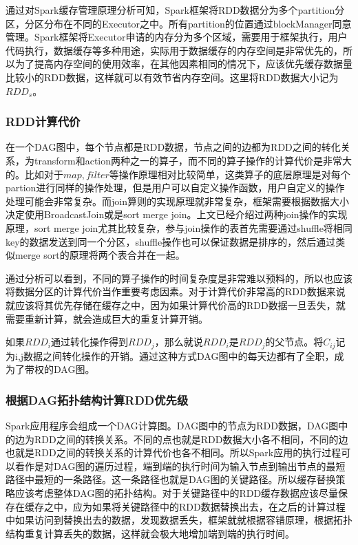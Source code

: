 通过对Spark缓存管理原理分析可知，Spark框架将RDD数据分为多个partition分区，分区分布在不同的Executor之中。所有partition的位置通过blockManager同意管理。Spark框架将Executor申请的内存分为多个区域，需要用于框架执行，用户代码执行，数据缓存等多种用途，实际用于数据缓存的内存空间是非常优先的，所以为了提高内存空间的使用效率，在其他因素相同的情况下，应该优先缓存数据量比较小的RDD数据，这样就可以有效节省内存空间。这里将RDD数据大小记为$RDD_s$。

\subsubsection{RDD计算代价}

在一个DAG图中，每个节点都是RDD数据，节点之间的边都为RDD之间的转化关系，为transform和action两种之一的算子，而不同的算子操作的计算代价是非常大的。比如对于$map,filter$等操作原理相对比较简单，这类算子的底层原理是对每个partion进行同样的操作处理，但是用户可以自定义操作函数，用户自定义的操作处理可能会非常复杂。而join算则的实现原理就非常复杂，框架需要根据数据大小决定使用BroadcastJoin或是sort merge join。上文已经介绍过两种join操作的实现原理，sort merge join尤其比较复杂，参与join操作的表首先需要通过shuffle将相同key的数据发送到同一个分区，shuffle操作也可以保证数据是排序的，然后通过类似merge sort的原理将两个表合并在一起。

通过分析可以看到，不同的算子操作的时间复杂度是非常难以预料的，所以也应该将数据分区的计算代价当作重要考虑因素。对于计算代价非常高的RDD数据来说就应该将其优先存储在缓存之中，因为如果计算代价高的RDD数据一旦丢失，就需要重新计算，就会造成巨大的重复计算开销。

如果$RDD_i$通过转化操作得到$RDD_j$，那么就说$RDD_i$是$RDD_j$的父节点。将$C_{ij}$记为i,j数据之间转化操作的开销。通过这种方式DAG图中的每天边都有了全职，成为了带权的DAG图。

\subsubsection{根据DAG拓扑结构计算RDD优先级}

Spark应用程序会组成一个DAG计算图。DAG图中的节点为RDD数据，DAG图中的边为RDD之间的转换关系。不同的点也就是RDD数据大小各不相同，不同的边也就是RDD之间的转换关系的计算代价也各不相同。所以Spark应用的执行过程可以看作是对DAG图的遍历过程，端到端的执行时间为输入节点到输出节点的最短路径中最短的一条路径。这一条路径也就是DAG图的关键路径。所以缓存替换策略应该考虑整体DAG图的拓扑结构。对于关键路径中的RDD缓存数据应该尽量保存在缓存之中，应为如果将关键路径中的RDD数据替换出去，在之后的计算过程中如果访问到替换出去的数据，发现数据丢失，框架就就根据容错原理，根据拓扑结构重复计算丢失的数据，这样就会极大地增加端到端的执行时间。

